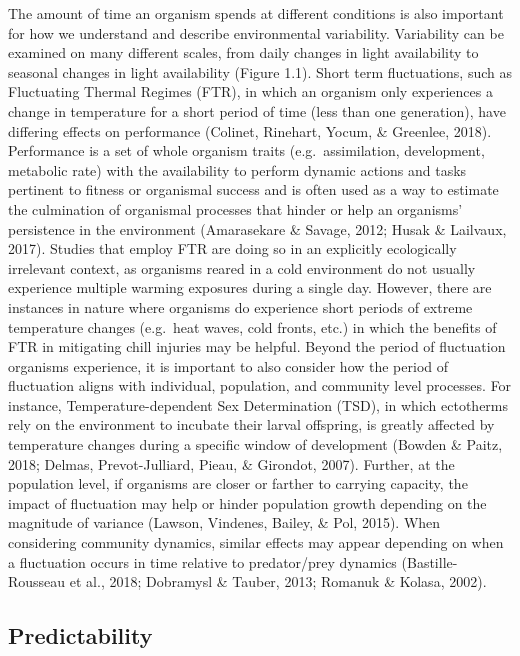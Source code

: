 \documentclass[12pt,twoside]{reedthesis}
\begin{document}
The amount of time an organism spends at different conditions is also important for how we understand and describe environmental variability. Variability can be examined on many different scales, from daily changes in light availability to seasonal changes in light availability (Figure 1.1). Short term fluctuations, such as Fluctuating Thermal Regimes (FTR), in which an organism only experiences a change in temperature for a short period of time (less than one generation), have differing effects on performance (Colinet, Rinehart, Yocum, \& Greenlee, 2018). Performance is a set of whole organism traits (e.g.~assimilation, development, metabolic rate) with the availability to perform dynamic actions and tasks pertinent to fitness or organismal success and is often used as a way to estimate the culmination of organismal processes that hinder or help an organisms' persistence in the environment (Amarasekare \& Savage, 2012; Husak \& Lailvaux, 2017). Studies that employ FTR are doing so in an explicitly ecologically irrelevant context, as organisms reared in a cold environment do not usually experience multiple warming exposures during a single day. However, there are instances in nature where organisms do experience short periods of extreme temperature changes (e.g.~heat waves, cold fronts, etc.) in which the benefits of FTR in mitigating chill injuries may be helpful. Beyond the period of fluctuation organisms experience, it is important to also consider how the period of fluctuation aligns with individual, population, and community level processes. For instance, Temperature-dependent Sex Determination (TSD), in which ectotherms rely on the environment to incubate their larval offspring, is greatly affected by temperature changes during a specific window of development (Bowden \& Paitz, 2018; Delmas, Prevot-Julliard, Pieau, \& Girondot, 2007). Further, at the population level, if organisms are closer or farther to carrying capacity, the impact of fluctuation may help or hinder population growth depending on the magnitude of variance (Lawson, Vindenes, Bailey, \& Pol, 2015). When considering community dynamics, similar effects may appear depending on when a fluctuation occurs in time relative to predator/prey dynamics (Bastille-Rousseau et al., 2018; Dobramysl \& Tauber, 2013; Romanuk \& Kolasa, 2002).

\hypertarget{predictability}{%
\subsection{Predictability}\label{predictability}}
\end{document}
